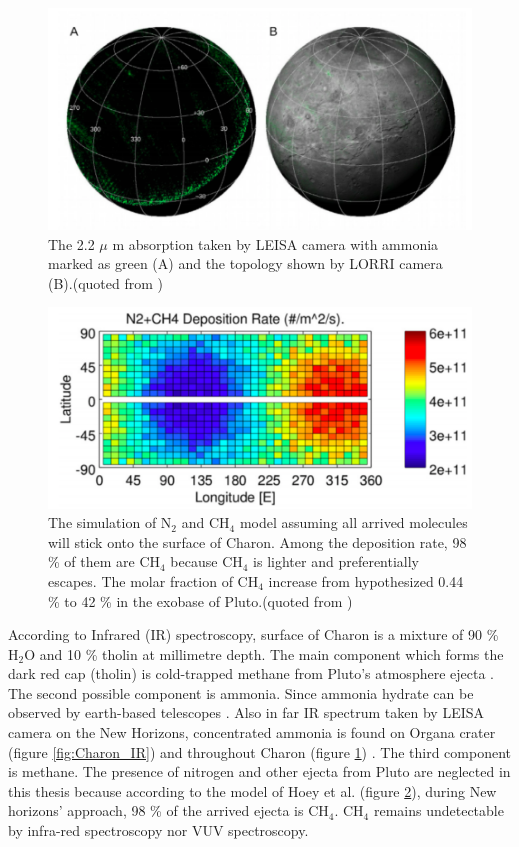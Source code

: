 \begin{figure}
\centering
\includegraphics[width=\textwidth]{figures/chapter1/ammonia.png}
\caption{ The 2.2 $\mu$ m absorption taken by LEISA camera with ammonia marked as green (A) and the topology shown by LORRI camera (B).(quoted from \cite{grundy2016surface})}
\label{fig:Charon_ammonia}
\end{figure}

\begin{figure}
\centering
\includegraphics[width=\textwidth]{figures/chapter1/methane.png}
\caption{The simulation of N$_2$ and CH$_4$ model assuming all arrived molecules will stick onto the surface of Charon. Among the deposition rate, 98 \% of them are CH$_4$ because CH$_4$ is lighter and preferentially escapes. The molar fraction of CH$_4$ increase from hypothesized 0.44 \% to 42 \% in the exobase of Pluto.(quoted from \cite{hoey2017rarefied})}
\label{fig:Charon_distribution}
\end{figure}

According to Infrared (IR) spectroscopy, surface of Charon is a mixture of 90 \% H$_2$O and 10 \% tholin at millimetre depth. The main component which forms the dark red cap (tholin) is cold-trapped methane from Pluto's atmosphere ejecta \cite{hoey2017rarefied}. The second possible component is ammonia. Since ammonia hydrate can be observed by earth-based telescopes \cite{cook2007near}. Also in far IR spectrum taken by LEISA camera on the New Horizons, concentrated ammonia is found on Organa crater (figure \ref{fig:Charon_IR}) and throughout Charon (figure \ref{fig:Charon_ammonia}) \cite{grundy2016surface}. The third component is methane. The presence of nitrogen and other ejecta from Pluto are neglected in this thesis because according to the model of Hoey et al.\cite{hoey2017rarefied} (figure \ref{fig:Charon_distribution}), during New horizons' approach, 98 \% of the arrived ejecta is CH$_4$. CH$_4$ remains undetectable by infra-red spectroscopy nor VUV spectroscopy.

